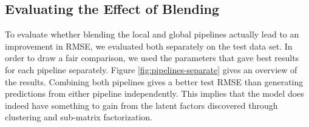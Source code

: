 \documentclass[10pt,conference,compsocconf]{IEEEtran}
\begin{document}



\subsection{Evaluating the Effect of Blending}
To evaluate whether blending the local and global pipelines actually lead to an improvement in RMSE, we evaluated both separately on the test data set. In order to draw a fair comparison, we used the parameters that gave best results for each pipeline separately. Figure \ref{fig:pipelines-separate} gives an overview of the results. Combining both pipelines gives a better test RMSE than generating predictions from either pipeline independently. This implies that the model does indeed have something to gain from the latent factors discovered through clustering and sub-matrix factorization.
\end{document}
